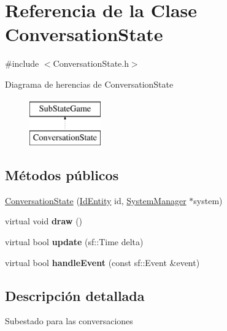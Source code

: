 \hypertarget{classConversationState}{}\section{Referencia de la Clase Conversation\+State}
\label{classConversationState}


{\ttfamily \#include $<$Conversation\+State.\+h$>$}

Diagrama de herencias de Conversation\+State\begin{figure}[H]
\begin{center}
\leavevmode
\includegraphics[height=2.000000cm]{classConversationState}
\end{center}
\end{figure}
\subsection*{Métodos públicos}
\begin{DoxyCompactItemize}
\item 
\hyperlink{classConversationState_a48512b6f1190aba61f243c4b1493778e}{Conversation\+State} (\hyperlink{classIdEntity}{Id\+Entity} id, \hyperlink{classSystemManager}{System\+Manager} $\ast$system)
\item 
\hypertarget{classConversationState_a0b2912e51f3be637027926e05c812820}{}virtual void {\bfseries draw} ()\label{classConversationState_a0b2912e51f3be637027926e05c812820}

\item 
\hypertarget{classConversationState_af509923e03dfe0abba9083e2b69d11af}{}virtual bool {\bfseries update} (sf\+::\+Time delta)\label{classConversationState_af509923e03dfe0abba9083e2b69d11af}

\item 
\hypertarget{classConversationState_a40e9dfb6b691cc962387b48c40feba16}{}virtual bool {\bfseries handle\+Event} (const sf\+::\+Event \&event)\label{classConversationState_a40e9dfb6b691cc962387b48c40feba16}

\end{DoxyCompactItemize}


\subsection{Descripción detallada}
Subestado para las conversaciones 

